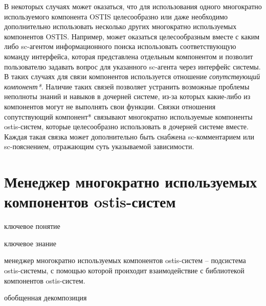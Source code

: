 В некоторых случаях может оказаться, что для использования одного многократно используемого компонента OSTIS целесообразно или даже необходимо дополнительно использовать несколько других многократно используемых компонентов OSTIS. Например, может оказаться целесообразным вместе с каким либо sc-агентом информационного поиска использовать соответствующую команду интерфейса, которая представлена отдельным
компонентом и позволит пользователю задавать вопрос для указанного sc-агента через интерфейс системы. В таких случаях для связи компонентов используется отношение \textit{сопутствующий компонент*}. Наличие таких связей позволяет устранить возможные проблемы неполноты знаний и навыков в дочерней системе, из-за которых какие-либо из компонентов могут не выполнять свои функции. Связки отношения сопутствующий компонент* связывают многократно используемые компоненты ostis-систем, которые целесообразно использовать в дочерней системе вместе. Каждая такая связка может дополнительно быть снабжена sc-комментарием или sc-пояснением, отражающим суть указываемой зависимости.

\section{Менеджер многократно используемых компонентов ostis-систем}
\label{ostis_library_component_manager}

\begin{SCn}
\begin{scnrelfromlist}{ключевое понятие}
\end{scnrelfromlist}
\end{SCn}

\bigskip

\begin{SCn}
\begin{scnrelfromlist}{ключевое знание}
\end{scnrelfromlist}
\end{SCn}

\bigskip

менеджер многократно используемых компонентов ostis-систем -- подсистема ostis-системы, с помощью которой проиходит взаимодействие с библиотекой компонентов ostis-систем.

\begin{SCn}
\begin{scnrelfromset}{обобщенная декомпозиция}
\end{scnrelfromset}
\end{SCn}

